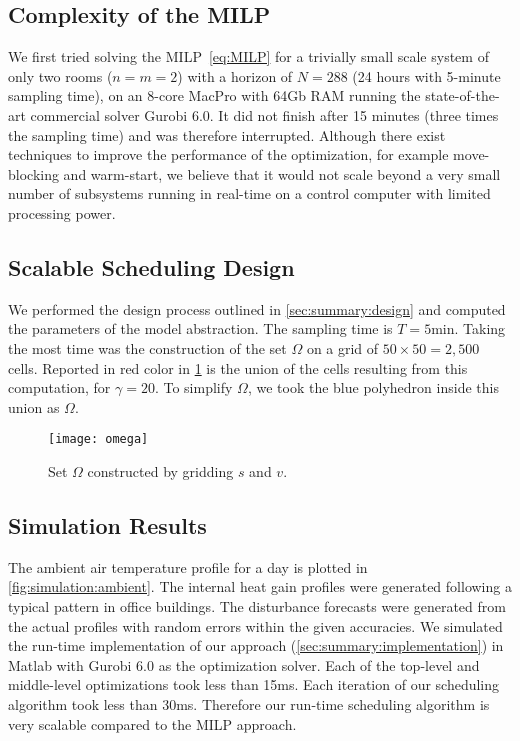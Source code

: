 \subsection{Complexity of the MILP} %
\label{sec:simulation:milp}

We first tried solving the MILP~\eqref{eq:MILP} for a trivially small scale system of only two rooms ($n=m=2$) with a horizon of $N=288$ (24 hours with 5-minute sampling time), on an 8-core MacPro with 64Gb RAM running the state-of-the-art commercial solver Gurobi 6.0.
It did not finish after %
15 minutes (three times the sampling time) and was therefore interrupted.
Although there exist techniques to improve the performance of the optimization, for example move-blocking and warm-start, we believe that it would not scale beyond a very small number of subsystems running in real-time on a control computer with limited processing power.

\subsection{Scalable Scheduling Design}
\label{sec:simulation:design}

We performed the design process outlined in \cref{sec:summary:design} %
and computed the parameters of the model abstraction.
The sampling time is $T = 5 \text{min}$.
Taking the most time was the construction of the set $\Omega$ on a grid of $50 \times 50 = 2\comma 500$ cells.
Reported in red color in \cref{fig:simulation:omega} is the union of the cells resulting from this computation, for $\gamma = 20$.
To simplify $\Omega$, we took the blue polyhedron inside this union as $\Omega$.

\begin{figure}[tb]
  \centering
  \texttt{[image: omega]}
  \vspace{-10pt}
  \caption{Set $\Omega$ constructed by gridding $s$ and $v$.}
  \vspace{-10pt}
  \label{fig:simulation:omega}
\end{figure}


\subsection{Simulation Results}
\label{sec:simulation:results}

The ambient air temperature profile for a day %
is plotted in \cref{fig:simulation:ambient}.
The internal heat gain profiles were generated following a typical pattern in office buildings.
The disturbance forecasts were generated from the actual profiles with random errors within the given accuracies.
We simulated the run-time implementation of our %
 approach (\cref{sec:summary:implementation}) in Matlab with Gurobi 6.0 as the optimization solver.
Each of the top-level and middle-level optimizations %
 took less than 15ms. %
Each iteration of our scheduling algorithm took less than 30ms.
Therefore our run-time scheduling algorithm is very scalable compared to the MILP approach.

